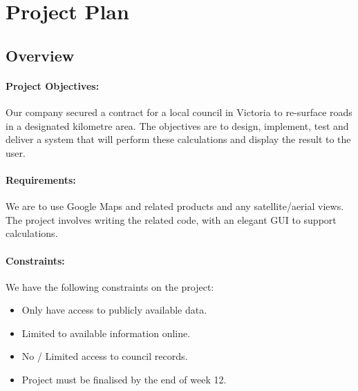 \documentclass[a4paper,11pt]{article}
\begin{document}
\section{Project Plan}




\subsection{Overview}

\paragraph{Project Objectives:}

Our company secured a contract for a local council in Victoria to re-surface
roads in a designated kilometre area. The objectives are to design, implement,
test and deliver a system that will perform these calculations and display the
result to the user.

\paragraph{Requirements:}

We are to use Google Maps and related products and any satellite/aerial views.
The project involves writing the related code, with an elegant GUI to support
calculations. \autocite[2]{intro:1}

\paragraph{Constraints:}

We have the following constraints on the project:

\begin{itemize}
  \item Only have access to publicly available data.
  \item Limited to available information online.
  \item No / Limited access to council records.
  \item Project must be finalised by the end of week 12.
\end{itemize}
\end{document}
